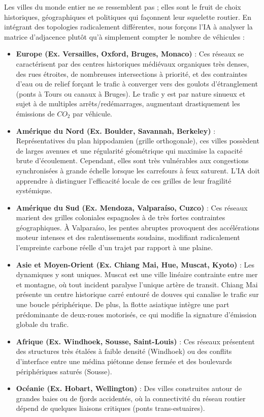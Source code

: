 \documentclass[10pt, a4paper]{article}
\providecommand{\tightlist}{}
\begin{document}
Les villes du monde entier ne se ressemblent pas ; elles sont le fruit
de choix historiques, géographiques et politiques qui façonnent leur
squelette routier. En intégrant des topologies radicalement différentes,
nous forçons l'IA à analyser la matrice d'adjacence plutôt qu'à
simplement compter le nombre de véhicules :

\begin{itemize}
\tightlist
\item
  \textbf{Europe (Ex. Versailles, Oxford, Bruges, Monaco)} : Ces réseaux
  se caractérisent par des centres historiques médiévaux organiques très
  denses, des rues étroites, de nombreuses intersections à priorité, et
  des contraintes d'eau ou de relief forçant le trafic à converger vers
  des goulots d'étranglement (ponts à Tours ou canaux à Bruges). Le
  trafic y est par nature sinueux et sujet à de multiples
  arrêts/redémarrages, augmentant drastiquement les émissions de
  \(CO_2\) par véhicule.
\item
  \textbf{Amérique du Nord (Ex. Boulder, Savannah, Berkeley)} :
  Représentatives du plan hippodamien (grille orthogonale), ces villes
  possèdent de larges avenues et une régularité géométrique qui maximise
  la capacité brute d'écoulement. Cependant, elles sont très vulnérables
  aux congestions synchronisées à grande échelle lorsque les carrefours
  à feux saturent. L'IA doit apprendre à distinguer l'efficacité locale
  de ces grilles de leur fragilité systémique.
\item
  \textbf{Amérique du Sud (Ex. Mendoza, Valparaíso, Cuzco)} : Ces
  réseaux marient des grilles coloniales espagnoles à de très fortes
  contraintes géographiques. À Valparaíso, les pentes abruptes
  provoquent des accélérations moteur intenses et des ralentissements
  soudains, modifiant radicalement l'empreinte carbone réelle d'un
  trajet par rapport à une plaine.
\item
  \textbf{Asie et Moyen-Orient (Ex. Chiang Mai, Hue, Muscat, Kyoto)} :
  Les dynamiques y sont uniques. Muscat est une ville linéaire
  contrainte entre mer et montagne, où tout incident paralyse l'unique
  artère de transit. Chiang Mai présente un centre historique carré
  entouré de douves qui canalise le trafic sur une boucle périphérique.
  De plus, la flotte asiatique intègre une part prédominante de
  deux-roues motorisés, ce qui modifie la signature d'émission globale
  du trafic.
\item
  \textbf{Afrique (Ex. Windhoek, Sousse, Saint-Louis)} : Ces réseaux
  présentent des structures très étalées à faible densité (Windhoek) ou
  des conflits d'interface entre une médina piétonne dense fermée et des
  boulevards périphériques saturés (Sousse).
\item
  \textbf{Océanie (Ex. Hobart, Wellington)} : Des villes construites
  autour de grandes baies ou de fjords accidentés, où la connectivité du
  réseau routier dépend de quelques liaisons critiques (ponts
  trans-estuaires).
\end{itemize}
\end{document}
